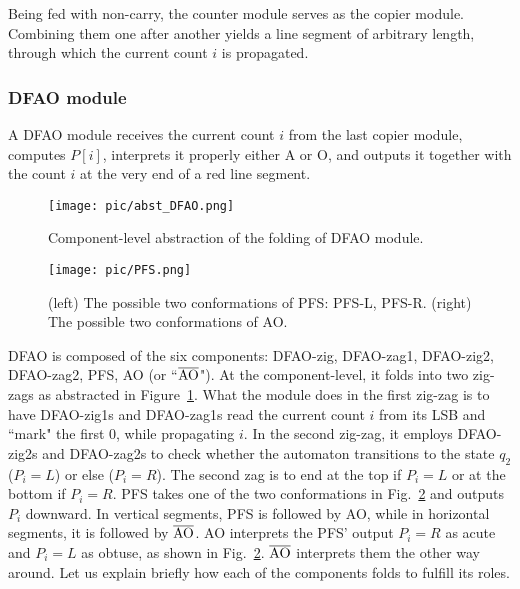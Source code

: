 Being fed with non-carry, the counter module serves as the copier module. 
Combining them one after another yields a line segment of arbitrary length, through which the current count $i$ is propagated. 


			\subsubsection{DFAO module}


A DFAO module receives the current count $i$ from the last copier module, computes $P[i]$, interprets it properly either A or O, and outputs it together with the count $i$ at the very end of a red line segment. 

\begin{figure}[h]
\texttt{[image: pic/abst\_DFAO.png]}
\caption{Component-level abstraction of the folding of DFAO module.}
\label{fig:abst_dfao}
\end{figure}


\begin{figure}[h]
\texttt{[image: pic/PFS.png]}
\caption{(left) The possible two conformations of PFS: PFS-L, PFS-R. (right) The possible two conformations of AO.}
\label{fig:PFS}
\end{figure}


DFAO is composed of the six components: DFAO-zig, DFAO-zag1, DFAO-zig2, DFAO-zag2, PFS, AO (or  ``$\overline{\rm AO}$").
At the component-level, it folds into two zig-zags as abstracted in Figure~\ref{fig:abst_dfao}.
What the module does in the first zig-zag is to have DFAO-zig1s and DFAO-zag1s read the current count $i$ from its LSB and ``mark" the first 0, while propagating $i$.
In the second zig-zag, it employs DFAO-zig2s and DFAO-zag2s to check whether the automaton transitions to the state $q_2$ ($P_i = L$) or else ($P_i = R$).
The second zag is to end at the top if $P_i = L$ or at the bottom if $P_i = R$.
PFS takes one of the two conformations in Fig.~\ref{fig:PFS} and outputs $P_i$ downward.
In vertical segments, PFS is followed by AO, while in horizontal segments, it is followed by $\overline{\rm AO}$.
AO interprets the PFS' output $P_i = R$ as acute and $P_i = L$ as obtuse, as shown in Fig.~\ref{fig:PFS}.
$\overline{\rm AO}$ interprets them the other way around.
Let us explain briefly how each of the components folds to fulfill its roles.

